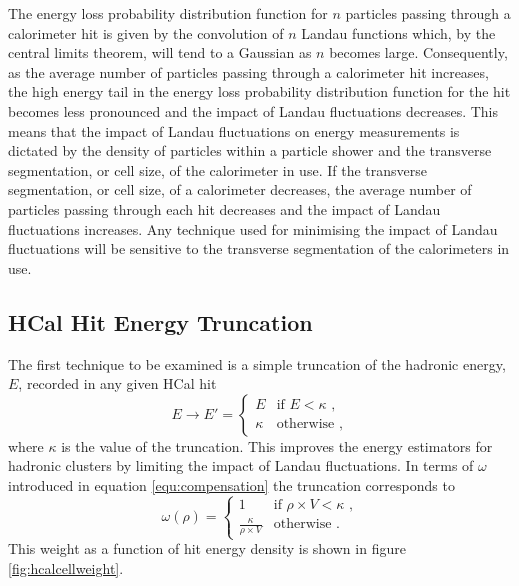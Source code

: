 The energy loss probability distribution function for $n$ particles passing through a calorimeter hit is given by the convolution of $n$ Landau functions which, by the central limits theorem, will tend to a Gaussian as $n$ becomes large.  Consequently, as the average number of particles passing through a calorimeter hit increases, the high energy tail in the energy loss probability distribution function for the hit becomes less pronounced and the impact of Landau fluctuations decreases.  This means that the impact of Landau fluctuations on energy measurements is dictated by the density of particles within a particle shower and the transverse segmentation, or cell size, of the calorimeter in use.  If the transverse segmentation, or cell size, of a calorimeter decreases, the average number of particles passing through each hit decreases and the impact of Landau fluctuations increases.  Any technique used for minimising the impact of Landau fluctuations will be sensitive to the transverse segmentation of the calorimeters in use.  


\subsection{HCal Hit Energy Truncation}
\label{sec:hcalcelltruncation}
The first technique to be examined is a simple truncation of the hadronic energy, $E$, recorded in any given HCal hit
%
\begin{equation}
E \rightarrow E' =
\begin{cases}
E & \text{if } E < \kappa \text{ ,} \\
\kappa & \text{otherwise} \text{ ,}
\end{cases}
\end{equation}
%
\noindent where $\kappa$ is the value of the truncation.  This improves the energy estimators for hadronic clusters by limiting the impact of Landau fluctuations.  In terms of $\omega$ introduced in equation \ref{equ:compensation} the truncation corresponds to
%
\begin{equation}
\omega(\rho) =
\begin{cases}
1 & \text{if } \rho \times V < \kappa \text{ ,} \\
\frac{\kappa}{\rho \times V} & \text{otherwise} \text{ .}
\end{cases}
\end{equation}
%
\noindent This weight as a function of hit energy density is shown in figure \ref{fig:hcalcellweight}.  

